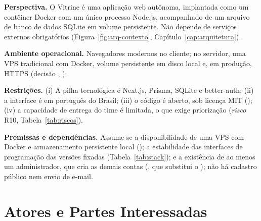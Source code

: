\textbf{Perspectiva.} O Vitrine é uma aplicação web autônoma, implantada como um contêiner Docker com um único processo Node.js, acompanhado de um arquivo de banco de dados SQLite em volume persistente. Não depende de serviços externos obrigatórios (Figura~\ref{fig:arq-contexto}, Capítulo~\ref{cap:arquitetura}).

\textbf{Ambiente operacional.} Navegadores modernos no cliente; no servidor, uma VPS tradicional com Docker, volume persistente em disco local e, em produção, HTTPS (decisão , ).

\textbf{Restrições.} (i) A pilha tecnológica é Next.js, Prisma, SQLite e better-auth; (ii) a interface é em português do Brasil; (iii) o código é aberto, sob licença MIT (); (iv) a capacidade de entrega do time é limitada, o que exige priorização (\emph{risco} R10, Tabela~\ref{tab:riscos}).

\textbf{Premissas e dependências.} Assume-se a disponibilidade de uma VPS com Docker e armazenamento persistente local (); a estabilidade das interfaces de programação das versões fixadas (Tabela~\ref{tab:stack}); e a existência de ao menos um administrador, que cria as demais contas (, que substitui o ); não há cadastro público nem envio de e-mail.

\section{Atores e Partes Interessadas}\label{sec:atores}

